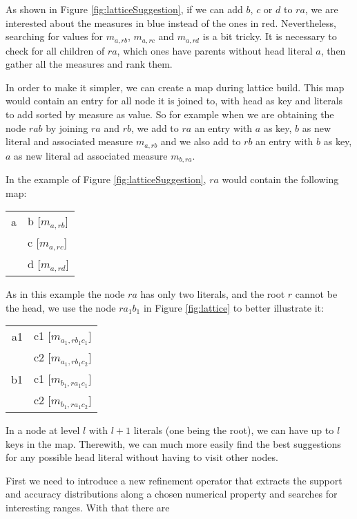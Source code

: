 As shown in Figure \ref{fig:latticeSuggestion}, if we can add $b$, $c$ or $d$ to $ra$, we are interested about the
measures in blue instead of the ones in red. Nevertheless, searching for values for $m_{a,rb}$, $m_{a,rc}$ and
$m_{a,rd}$ is a bit tricky. It is necessary to check for all children of $ra$, which ones have parents without head
literal $a$, then gather all the measures and rank them.

In order to make it simpler, we can create a map during lattice build. This map would contain an entry for all node
it is joined to, with head as key and literals to add sorted by measure as value. So for example when we are obtaining
the node $rab$ by joining $ra$ and $rb$, we add to $ra$ an entry with $a$ as key, $b$ as new literal and
associated measure $m_{a,rb}$ and we also add to $rb$ an entry with $b$ as key, $a$ as new literal ad associated
measure $m_{b,ra}$. 

In the example of Figure \ref{fig:latticeSuggestion}, $ra$ would contain the following map:

\begin{center}
  \begin{tabular}{r | l}
    a & b [$m_{a,rb}$] \\
      & c [$m_{a,rc}$] \\
      & d [$m_{a,rd}$]
  \end{tabular}
\end{center}

As in this example the node $ra$ has only two literals, and the root $r$ cannot be the head, we use the node $ra_1b_1$
in Figure \ref{fig:lattice} to better illustrate it:

\begin{center}
  \begin{tabular}{r | l}
    a1 	& c1 [$m_{a_1,rb_1c_1}$] \\
	& c2 [$m_{a_1,rb_1c_2}$] \\
    \hline
    b1	& c1 [$m_{b_1,ra_1c_1}$] \\
	& c2 [$m_{b_1,ra_1c_2}$]
  \end{tabular}
\end{center}

In a node at level $l$ with $l+1$ literals (one being the root), we can have up to $l$ keys in the map. Therewith, we
can much more easily find the best suggestions for any possible head literal without having to visit other nodes.

First we need to introduce a new refinement operator that extracts the support and accuracy distributions along a chosen
numerical property and searches for interesting ranges. With that there are

